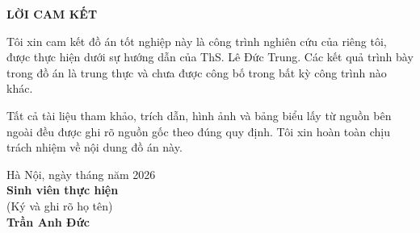 \documentclass[../DoAn.tex]{subfiles}
\begin{document}
\thispagestyle{empty}

\begin{center}
    \textbf{\large LỜI CAM KẾT}
\end{center}

\vspace{1cm}

Tôi xin cam kết đồ án tốt nghiệp này là công trình nghiên cứu của riêng tôi, được thực hiện dưới sự hướng dẫn của ThS. Lê Đức Trung. Các kết quả trình bày trong đồ án là trung thực và chưa được công bố trong bất kỳ công trình nào khác.

Tất cả tài liệu tham khảo, trích dẫn, hình ảnh và bảng biểu lấy từ nguồn bên ngoài đều được ghi rõ nguồn gốc theo đúng quy định. Tôi xin hoàn toàn chịu trách nhiệm về nội dung đồ án này.

\vspace{3cm}

\begin{flushright}
    Hà Nội, ngày \quad\quad tháng \quad\quad năm 2026\\[1cm]
    \textbf{Sinh viên thực hiện}\\[0.4cm]
    (Ký và ghi rõ họ tên)\\[2.5cm]
    \textbf{Trần Anh Đức}
\end{flushright}
\end{document}
